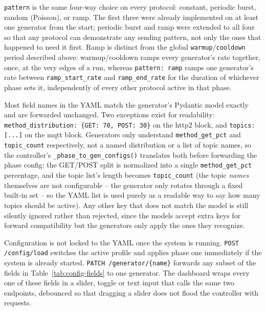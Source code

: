 \texttt{pattern} is the same four-way choice on every protocol: constant,
periodic burst, random (Poisson), or ramp. The first three were already
implemented on at least one generator from the start; periodic burst and
ramp were extended to all four so that any protocol can demonstrate any
sending pattern, not only the ones that happened to need it first. Ramp is
distinct from the global \texttt{warmup}/\texttt{cooldown} period described
above: warmup/cooldown ramps every generator's rate together, once, at the
very edges of a run, whereas \texttt{pattern: ramp} ramps one generator's
rate between \texttt{ramp\_start\_rate} and \texttt{ramp\_end\_rate} for the
duration of whichever phase sets it, independently of every other protocol
active in that phase.

Most field names in the YAML match the generator's Pydantic model exactly
and are forwarded unchanged. Two exceptions exist for readability:
\texttt{method\_distribution: \{GET: 70, POST: 30\}} on the http2 block, and
\texttt{topics: [...]} on the mqtt block. Generators only understand
\texttt{method\_get\_pct} and \texttt{topic\_count} respectively, not a named
distribution or a list of topic names, so the controller's
\texttt{\_phase\_to\_gen\_configs()} translates both before forwarding the
phase config: the GET/POST split is normalized into a single
\texttt{method\_get\_pct} percentage, and the topic list's length becomes
\texttt{topic\_count} (the topic \emph{names} themselves are not
configurable -- the generator only rotates through a fixed built-in set --
so the YAML list is used purely as a readable way to say how many topics
should be active). Any other key that does not match the model is still
silently ignored rather than rejected, since the models accept extra keys
for forward compatibility but the generators only apply the ones they
recognize.

Configuration is not locked to the YAML once the system is running.
\texttt{POST /config/load} switches the active profile and applies phase one
immediately if the system is already started. \texttt{PATCH /generator/\{name\}}
forwards any subset of the fields in Table~\ref{tab:config-fields} to one
generator. The dashboard wraps every one of these fields in a slider, toggle
or text input that calls the same two endpoints, debounced so that dragging a
slider does not flood the controller with requests.

